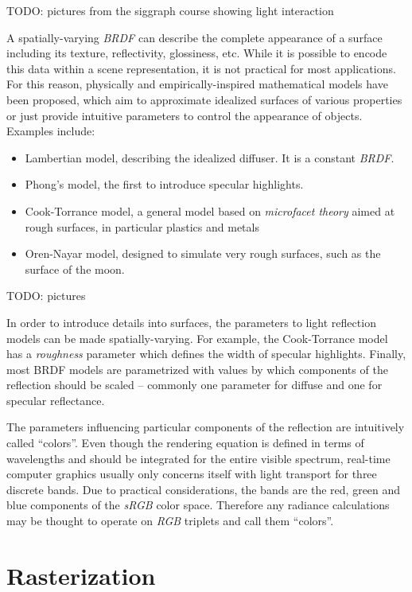 TODO: pictures from the siggraph course showing light interaction

A spatially-varying \emph{BRDF} can describe the complete appearance of a surface including its texture, reflectivity, glossiness, etc. While it is possible to encode this data within a scene representation, it is not practical for most applications. For this reason, physically and empirically-inspired mathematical models have been proposed, which aim to approximate idealized surfaces of various properties or just provide intuitive parameters to control the appearance of objects. Examples include:
\begin{itemize}
\item Lambertian model, describing the idealized diffuser. It is a constant \emph{BRDF}.
\item Phong's model, the first to introduce specular highlights.
\item Cook-Torrance model, a general model based on \emph{microfacet theory} aimed at rough surfaces, in particular plastics and metals
\item Oren-Nayar model, designed to simulate very rough surfaces, such as the surface of the moon.
\end{itemize}
TODO: pictures

In order to introduce details into surfaces, the parameters to light reflection models can be made spatially-varying. For example, the Cook-Torrance model has a \emph{roughness} parameter which defines the width of specular highlights.  Finally, most BRDF models are parametrized with values by which components of the reflection should be scaled -- commonly one parameter for diffuse and one for specular reflectance.

The parameters influencing particular components of the reflection are intuitively called ``colors''. Even though the rendering equation is defined in terms of wavelengths and should be integrated for the entire visible spectrum, real-time computer graphics usually only concerns itself with light transport for three discrete bands. Due to practical considerations, the bands are the red, green and blue components of the \emph{sRGB} color space. Therefore any radiance calculations may be thought to operate on \emph{RGB} triplets and call them ``colors''.

\section{Rasterization}

